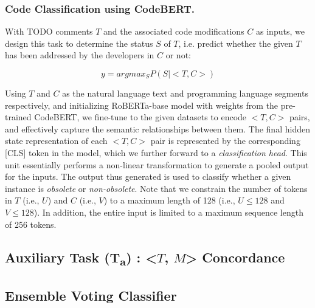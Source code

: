 \subsubsection{Code Classification using CodeBERT.}
With TODO comments $T$ and the associated code modifications 
$C$ as inputs, we design this task to determine the status 
$S$ of $T$, i.e. predict whether the given $T$ has been addressed by
the developers in $C$ or not:

\begin{equation}
    y = argmax_S P(S|<T, C>)
\end{equation}

Using $T$ and $C$ as the natural language text and programming
language segments respectively, and initializing RoBERTa-base 
model with weights from the pre-trained CodeBERT, we fine-tune 
to the given datasets to encode $<T, C>$ pairs, and effectively 
capture the semantic relationships between them. The final hidden 
state representation of each $<T, C>$ pair is represented by the
corresponding [CLS] token in the model, which we further forward 
to a {\em classification head}. This unit essentially performs a non-linear 
transformation to generate a pooled output for the inputs. The 
output thus generated is used to classify whether a given instance 
is \textit{obsolete} or \textit{non-obsolete}.  Note that we constrain the number of 
tokens in $T$ (i.e., $U$) and $C$ (i.e., $V$) to a maximum length of 128
(i.e., $U \leq 128$ and $V \leq 128$). In addition, the entire input is limited to a 
maximum sequence length of 256 tokens.


\subsection{Auxiliary Task \texorpdfstring{(T\textsubscript{a})}{} : \texorpdfstring{<$T$, $M$>}{} Concordance}

\subsection{Ensemble Voting Classifier}
